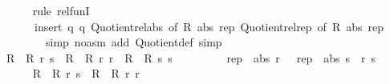 \begin{isabellebody}
\ \ \ \ \isamarkupfalse%
\ {\isacharparenleft}{\kern0pt}rule\ rel{\isacharunderscore}{\kern0pt}funI{\isacharparenright}{\kern0pt}\isanewline
\ \ \ \ \ \ {\isacharparenleft}{\kern0pt}insert\ q{}\ q{}\ Quotient{}{\isacharunderscore}{\kern0pt}rel{\isacharunderscore}{\kern0pt}abs\ {\isacharbrackleft}{\kern0pt}of\ R{}\ abs{}\ rep{}{\isacharbrackright}{\kern0pt}\ Quotient{}{\isacharunderscore}{\kern0pt}rel{\isacharunderscore}{\kern0pt}rep\ {\isacharbrackleft}{\kern0pt}of\ R{}\ abs{}\ rep{}{\isacharbrackright}{\kern0pt}{\isacharcomma}{\kern0pt}\isanewline
\ \ \ \ \ \ \ \ simp\ {\isacharparenleft}{\kern0pt}no{\isacharunderscore}{\kern0pt}asm{\isacharparenright}{\kern0pt}\ add{\isacharcolon}{\kern0pt}\ Quotient{}{\isacharunderscore}{\kern0pt}def{\isacharcomma}{\kern0pt}\ simp{\isacharparenright}{\kern0pt}\isanewline
\ \ \isamarkupfalse%
\isanewline
\ \ \isamarkupfalse%
\ {\isachardoublequoteopen}{\isacharparenleft}{\kern0pt}R{}\ {\isacharequal}{\kern0pt}{\isacharequal}{\kern0pt}{\isacharequal}{\kern0pt}{\isachargreater}{\kern0pt}\ R{}{\isacharparenright}{\kern0pt}\ r\ s\ {\isacharequal}{\kern0pt}\ {\isacharparenleft}{\kern0pt}{\isacharparenleft}{\kern0pt}R{}\ {\isacharequal}{\kern0pt}{\isacharequal}{\kern0pt}{\isacharequal}{\kern0pt}{\isachargreater}{\kern0pt}\ R{}{\isacharparenright}{\kern0pt}\ r\ r\ {\isasymand}\ {\isacharparenleft}{\kern0pt}R{}\ {\isacharequal}{\kern0pt}{\isacharequal}{\kern0pt}{\isacharequal}{\kern0pt}{\isachargreater}{\kern0pt}\ R{}{\isacharparenright}{\kern0pt}\ s\ s\ {\isasymand}\isanewline
\ \ \ \ \ \ \ \ {\isacharparenleft}{\kern0pt}rep{}\ {\isacharminus}{\kern0pt}{\isacharminus}{\kern0pt}{\isacharminus}{\kern0pt}{\isachargreater}{\kern0pt}\ abs{}{\isacharparenright}{\kern0pt}\ r\ \ {\isacharequal}{\kern0pt}\ {\isacharparenleft}{\kern0pt}rep{}\ {\isacharminus}{\kern0pt}{\isacharminus}{\kern0pt}{\isacharminus}{\kern0pt}{\isachargreater}{\kern0pt}\ abs{}{\isacharparenright}{\kern0pt}\ s{\isacharparenright}{\kern0pt}{\isachardoublequoteclose}\ \ r\ s\isanewline
\ \ \isamarkupfalse%
\ {\isacharminus}{\kern0pt}\isanewline
\ \ \ \ \isamarkupfalse%
\ {\isachardoublequoteopen}{\isacharparenleft}{\kern0pt}R{}\ {\isacharequal}{\kern0pt}{\isacharequal}{\kern0pt}{\isacharequal}{\kern0pt}{\isachargreater}{\kern0pt}\ R{}{\isacharparenright}{\kern0pt}\ r\ s\ {\isasymLongrightarrow}\ {\isacharparenleft}{\kern0pt}R{}\ {\isacharequal}{\kern0pt}{\isacharequal}{\kern0pt}{\isacharequal}{\kern0pt}{\isachargreater}{\kern0pt}\ R{}{\isacharparenright}{\kern0pt}\ r\ r{\isachardoublequoteclose}\ \isamarkupfalse%

\end{isabellebody}
